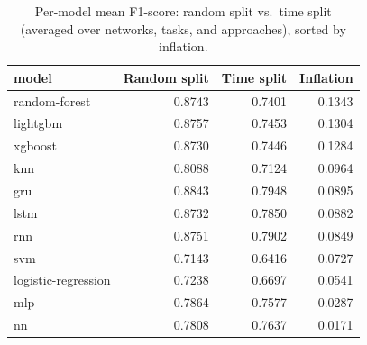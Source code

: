 \begin{table}
\caption{Per-model mean F1-score: random split vs.\ time split (averaged over networks, tasks, and approaches), sorted by inflation.}
\label{tab:q2_per_model}
\begin{tabular}{lrrr}
\toprule
model & Random split & Time split & Inflation \\
\midrule
random-forest & 0.8743 & 0.7401 & 0.1343 \\
lightgbm & 0.8757 & 0.7453 & 0.1304 \\
xgboost & 0.8730 & 0.7446 & 0.1284 \\
knn & 0.8088 & 0.7124 & 0.0964 \\
gru & 0.8843 & 0.7948 & 0.0895 \\
lstm & 0.8732 & 0.7850 & 0.0882 \\
rnn & 0.8751 & 0.7902 & 0.0849 \\
svm & 0.7143 & 0.6416 & 0.0727 \\
logistic-regression & 0.7238 & 0.6697 & 0.0541 \\
mlp & 0.7864 & 0.7577 & 0.0287 \\
nn & 0.7808 & 0.7637 & 0.0171 \\
\bottomrule
\end{tabular}
\end{table}
